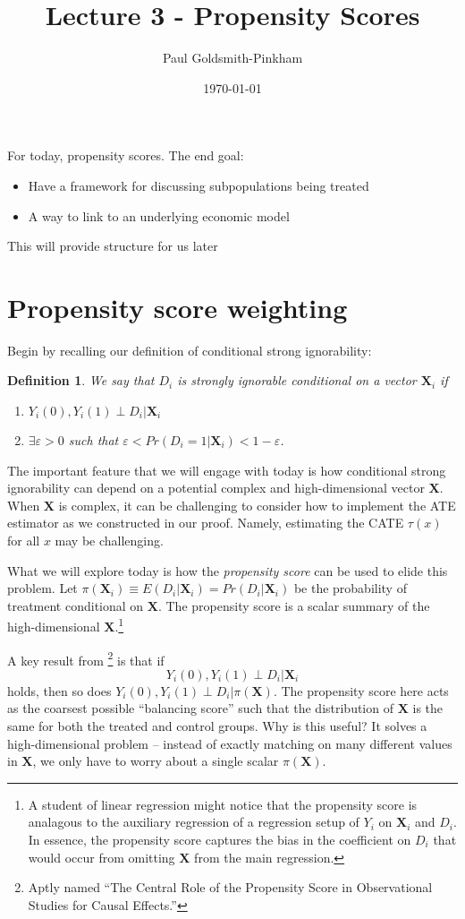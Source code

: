 \documentclass{tufte-handout}
\title{Lecture 3 - Propensity Scores}
\author{Paul Goldsmith-Pinkham}
\date{\today}
\theoremstyle{break}
\newtheorem{defN}{Definition}
\newcommand{\bX}{\mathbf{X}}
\begin{document}
\maketitle
For today, propensity scores. The end goal: 
    \begin{itemize}
    \item Have a framework for discussing subpopulations
      being treated
    \item A way to link to an underlying economic model
    \end{itemize}
This will provide structure for us later
 
\section{Propensity score weighting}

Begin by recalling our definition of conditional strong ignorability:
\begin{defN}
    \label{def:strong_ignorability}
    We say that $D_{i}$ is strongly ignorable conditional on a vector $\bX_{i}$ if
    \begin{enumerate}
  \item     $Y_{i}(0), Y_{i}(1) \perp D_{i} | \bX_{i}$
  \item $\exists \varepsilon > 0$ such that $\varepsilon < Pr(D_{i} = 1 | \bX_{i}) < 1-\varepsilon$.
    \end{enumerate}
  \end{defN}
The important feature that we will engage with today is how conditional strong ignorability can depend on a potential complex and high-dimensional vector $\bX$. When $\bX$ is complex, it can be challenging to consider how to implement the ATE estimator as we constructed in our proof. Namely, estimating the CATE $\tau(x)$ for all $x$ may be challenging.

What we will explore today is how the \emph{propensity score} can be used to elide this problem. Let $\pi(\bX_{i}) \equiv E(D_{i} | \bX_{i}) = Pr(D_{i} | \bX_{i})$ be the probability of treatment conditional on $\bX$. The propensity score is a scalar summary of the high-dimensional $\bX$.\footnote{A student of linear regression might notice that the propensity score is analagous to the auxiliary regression of a regression setup of $Y_{i}$ on $\bX_{i}$ and $D_{i}$. In essence, the propensity score captures the bias in the coefficient on $D_{i}$ that would occur from omitting $\bX$ from the main regression.}

A key result from \citet{rosenbaum1983central}\footnote{Aptly named ``The Central Role of the Propensity Score in Observational Studies for Causal Effects.''} is that if  
$$Y_{i}(0), Y_{i}(1) \perp D_{i} | \bX_{i}$$ 
holds, then so does  $Y_{i}(0), Y_{i}(1) \perp D_{i} | \pi(\bX)$. The propensity score here acts as the coarsest possible ``balancing score'' such that the distribution of $\bX$ is the same for both the treated and control groups. Why is this useful? It solves a high-dimensional problem -- instead of exactly matching on many different values in $\bX$, we only have to worry about a single scalar $\pi(\bX)$.
\end{document}
